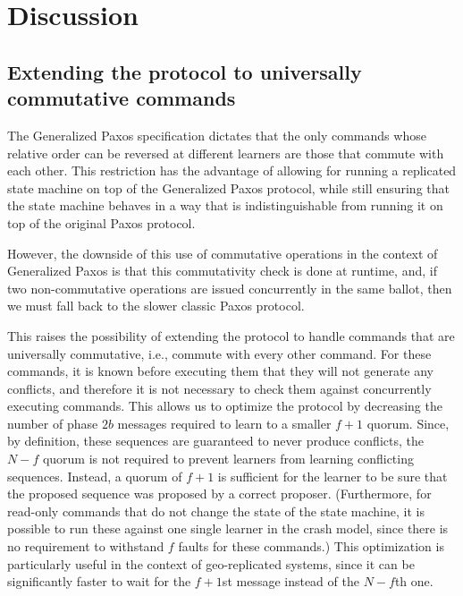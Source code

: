\section{Discussion}
\label{sec:disc}

\subsection{Extending the protocol to universally commutative commands}

The Generalized Paxos specification dictates that the only commands
whose relative order can be reversed at different learners are those
that commute with each other. This restriction has the advantage of
allowing for running a replicated state machine on top of the
Generalized Paxos protocol, while still ensuring that the state
machine behaves in a way that is indistinguishable from running it on
top of the original Paxos protocol.

However, the downside of this use of commutative operations in the
context of Generalized Paxos is that this commutativity check is done
at runtime, and, if two non-commutative operations are issued
concurrently in the same ballot, then we must fall back to the slower
classic Paxos protocol.

This raises the possibility of extending the protocol to handle
commands that are universally commutative, i.e., commute with every
other command. For these commands, it is known before executing them
that they will not generate any conflicts, and therefore it is not
necessary to check them against concurrently executing commands.  This
allows us to optimize the protocol by decreasing the number of phase
$2b$ messages required to learn to a smaller $f+1$ quorum. Since, by
definition, these sequences are guaranteed to never produce conflicts,
the $N-f$ quorum is not required to prevent learners from learning
conflicting sequences. Instead, a quorum of $f+1$ is sufficient for
the learner to be sure that the proposed sequence was proposed by a
correct proposer. (Furthermore, for read-only commands that do not
change the state of the state machine, it is possible to run these
against one single learner in the crash model, since there is no
requirement to withstand $f$ faults for these commands.)
This optimization is particularly useful in the context of 
geo-replicated systems, since it can be significantly faster
to wait for the $f+1$st message instead of the $N-f$th one.

